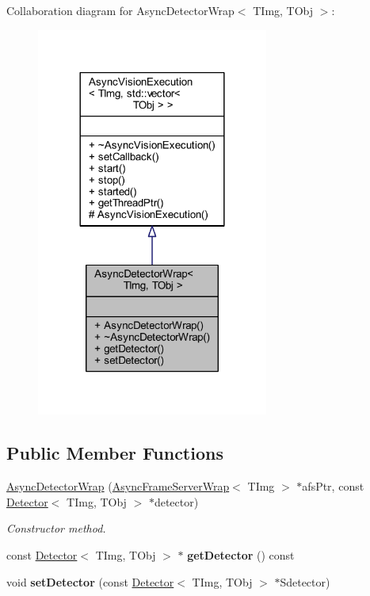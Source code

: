 Collaboration diagram for Async\+Detector\+Wrap$<$ T\+Img, T\+Obj $>$\+:
\nopagebreak
\begin{figure}[H]
\begin{center}
\leavevmode
\includegraphics[width=216pt]{class_vision_core_1_1_async_1_1_async_detector_wrap__coll__graph}
\end{center}
\end{figure}
\subsection*{Public Member Functions}
\begin{DoxyCompactItemize}
\item 
\hyperlink{class_vision_core_1_1_async_1_1_async_detector_wrap_a2b7d5e050fbeba8a1fbbda53258c041e}{Async\+Detector\+Wrap} (\hyperlink{class_vision_core_1_1_async_1_1_async_frame_server_wrap}{Async\+Frame\+Server\+Wrap}$<$ T\+Img $>$ $\ast$afs\+Ptr, const \hyperlink{class_vision_core_1_1_interfaces_1_1_detector}{Detector}$<$ T\+Img, T\+Obj $>$ $\ast$detector)
\begin{DoxyCompactList}\small\item\em Constructor method. \end{DoxyCompactList}\item 
\hypertarget{class_vision_core_1_1_async_1_1_async_detector_wrap_a6c965557375c470298058247830c1633}{}const \hyperlink{class_vision_core_1_1_interfaces_1_1_detector}{Detector}$<$ T\+Img, T\+Obj $>$ $\ast$ {\bfseries get\+Detector} () const \label{class_vision_core_1_1_async_1_1_async_detector_wrap_a6c965557375c470298058247830c1633}

\item 
\hypertarget{class_vision_core_1_1_async_1_1_async_detector_wrap_a2d06cfb8e49df174b8315898a0e4e3c7}{}void {\bfseries set\+Detector} (const \hyperlink{class_vision_core_1_1_interfaces_1_1_detector}{Detector}$<$ T\+Img, T\+Obj $>$ $\ast$Sdetector)\label{class_vision_core_1_1_async_1_1_async_detector_wrap_a2d06cfb8e49df174b8315898a0e4e3c7}

\end{DoxyCompactItemize}
